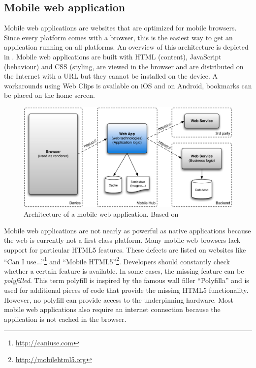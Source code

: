 \subsection{Mobile web application}

Mobile web applications are websites that are optimized for mobile browsers. Since every platform comes with a browser, this is the easiest way to get an application running on all platforms. An overview of this architecture is depicted in . Mobile web applications are built with HTML (content), JavaScript (behaviour) and CSS (styling, are viewed in the browser and are distributed on the Internet with a URL but they cannot be installed on the device. A workarounds using Web Clips \cite{Safari:webclips} is available on iOS and on Android, bookmarks can be placed on the home screen. 

\begin{figure}[h]
    \begin{center}
        \includegraphics[width=\textwidth]{figs/web.pdf}
        \caption{Architecture of a mobile web application. Based on \cite{Friese}}
        \label{fig:web}
    \end{center}
\end{figure}

Mobile web applications are not nearly as powerful as native applications because the web is currently not a first-class platform. Many mobile web browsers lack support for particular HTML5 features. These defects are listed on websites like ``Can I use...''\footnote{\url{http://caniuse.com}} and ``Mobile HTML5''\footnote{\url{http://mobilehtml5.org}}. Developers should constantly check whether a certain feature is available. In some cases, the missing feature can be \emph{polyfilled}. This term polyfill is inspired by the famous wall filler ``Polyfilla'' and is used for additional pieces of code that provide the missing HTML5 functionality. However, no polyfill can provide access to the underpinning hardware. Most mobile web applications also require an internet connection because the application is not cached in the browser. 


